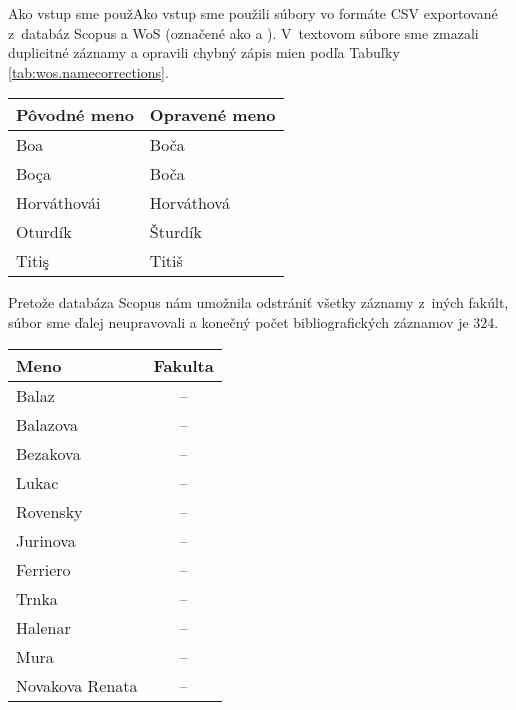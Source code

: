 
Ako vstup sme použAko vstup sme použili súbory vo formáte CSV exportované
z~databáz Scopus a WoS (označené ako  a
).  V~textovom súbore
 sme zmazali duplicitné záznamy a opravili
chybný zápis mien podľa Tabuľky \ref{tab:wos.namecorrections}.

\begin{SCtable}
\caption{Oprava chýb v~menách autorov v~súbore .}
\label{tab:wos.namecorrections}
\centering\small
\begin{tabular}{ll}
  \toprule\noalign{\vspace{.3ex}}
  Pôvodné meno & Opravené meno \\[0.3ex]
  \midrule\noalign{\vspace{.5ex}}
  Boa          & Boča       \\
  Boça         & Boča       \\
  Horváthovái  & Horváthová \\
  Oturdík      & Šturdík    \\
  Titiş        & Titiš      \\[0.5ex]
  \bottomrule
\end{tabular}
\end{SCtable}

Pretože databáza Scopus nám umožnila odstrániť všetky záznamy z~iných fakúlt,
súbor  sme ďalej neupravovali a konečný počet
bibliografických záznamov je 324.

\begin{SCtable}
\caption{Mená pracovníkov, ktorí nepatria do Fakulty prírodných vied.}
\label{tab:wos.excludedstaff}
\centering\small
\begin{tabular}{lc}
  \toprule\noalign{\vspace{.3ex}}
  Meno            & Fakulta \\[0.3ex]
  \midrule\noalign{\vspace{.5ex}}
  Balaz           & -- \\
  Balazova        & -- \\
  Bezakova        & -- \\
  Lukac           & -- \\
  Rovensky        & -- \\[1ex]
  Jurinova        & -- \\
  Ferriero        & -- \\
  Trnka           & -- \\
  Halenar         & -- \\
  Mura            & -- \\[1ex]
  Novakova Renata & -- \\[0.5ex]
  \bottomrule
\end{tabular}
\end{SCtable}

